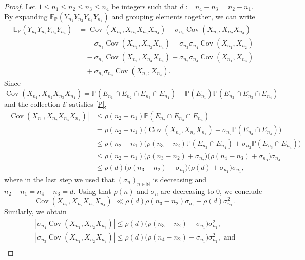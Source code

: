 \documentclass[10pt,a4paper]{amsart}
\newcommand{\Cov}{\operatorname{Cov}}
\newcommand{\N}{{\mathbb N}}
\begin{document}
\begin{proof}
  Let $1\leq n_1\leq n_2\leq n_3\leq n_4$ be integers such that $d:=n_4-n_3=n_2-n_1$. By expanding $\mathbb{E}_{\mathbb{P}}(Y_{n_1}Y_{n_2}Y_{n_3}Y_{n_4})$  and grouping elements together, we can write
\begin{equation}
\begin{split}
\mathbb{E}_{\mathbb{P}}\left( Y_{n_1} Y_{n_2} Y_{n_3} Y_{n_4} \right) &=\Cov(X_{n_1},X_{n_2}X_{n_3}X_{n_4})-\sigma_{n_4}\Cov(X_{n_1},X_{n_2}X_{n_3})\\
&\quad-\sigma_{n_3}\Cov(X_{n_1},X_{n_2}X_{n_4})+\sigma_{n_3}\sigma_{n_4}\Cov(X_{n_1},X_{n_2})\\
&\quad-\sigma_{n_2}\Cov(X_{n_1},X_{n_3}X_{n_4})+\sigma_{n_2}\sigma_{n_4}\Cov(X_{n_1},X_{n_3})\\
&\quad+\sigma_{n_2}\sigma_{n_3}\Cov(X_{n_1},X_{n_4}).
\end{split}  \label{split1} 
\end{equation}
Since $\Cov(X_{n_1},X_{n_2}X_{n_3}X_{n_4})=\mathbb{P}(E_{n_1}\cap E_{n_2}\cap E_{n_3}\cap E_{n_4})-\mathbb{P}(E_{n_1})\mathbb{P}(E_{n_2}\cap E_{n_3}\cap E_{n_4})$ and the collection $\mathcal{E}$ satisfies \eqref{P},
\begin{align*}
    |\Cov(X_{n_1},X_{n_2}X_{n_3}X_{n_4})|&\leq \rho(n_2-n_1)\mathbb{P}(E_{n_2}\cap E_{n_3}\cap E_{n_4})\\
      &=\rho(n_2-n_1)\Big(\Cov(X_{n_2},X_{n_3}X_{n_4})+\sigma_{n_2}\mathbb{P}(E_{n_3}\cap E_{n_4})\Big) \\
      &\leq \rho(n_2-n_1)\Big(\rho(n_3-n_2)\mathbb{P}(E_{n_3}\cap E_{n_4})+\sigma_{n_2}\mathbb{P}(E_{n_3}\cap E_{n_4})\Big) \\
      &\leq \rho(n_2-n_1)\Big(\rho(n_3-n_2)+\sigma_{n_2}\Big)\Big(\rho(n_4-n_3)+\sigma_{n_3}\Big)\sigma_{n_4}\\
      &\leq \rho(d)\Big(\rho(n_3-n_2)+\sigma_{n_1}\Big)\Big(\rho(d)+\sigma_{n_1}\Big)\sigma_{n_1},
\end{align*}
where in the last step we used that $(\sigma_n)_{n\in \N}$ is decreasing and $n_2-n_1=n_4-n_3=d$. Using that $\rho(n)$ and $\sigma_n$ are decreasing to 0, we conclude 
\[ |\Cov(X_{n_1},X_{n_2}X_{n_3}X_{n_4})|\ll \rho(d)\rho(n_3-n_2)\sigma_{n_1}+\rho(d)\sigma_{n_1}^2.\]Similarly, we obtain
\begin{equation}
\begin{split}
    &|\sigma_{n_4}\Cov(X_{n_1},X_{n_2}X_{n_3})|\leq \rho(d)\Big(\rho(n_3-n_2)+\sigma_{n_1}\Big)\sigma_{n_1}^2,\\
    &|\sigma_{n_3}\Cov(X_{n_1},X_{n_2}X_{n_4})|\leq \rho(d)\Big(\rho(n_4-n_2)+\sigma_{n_1}\Big)\sigma_{n_1}^2, \text{ and }\\

\end{split}
\end{equation}
\end{proof}
\end{document}
